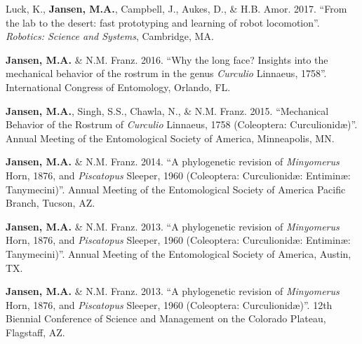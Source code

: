 \documentclass[12pt,a4paper]{article}
\begin{document}
\begin{description}
		\item Luck, K., \textbf{Jansen, M.A.}, Campbell, J., Aukes, D., \& H.B. Amor. 2017. ``From the lab to the desert: fast prototyping and learning of robot locomotion''. \textit{Robotics: Science and Systems}, Cambridge, MA.
		\item \textbf{Jansen, M.A.} \& N.M. Franz. 2016. ``Why the long face? Insights into the mechanical behavior of the rostrum in the genus \textit{Curculio} Linnaeus, 1758''. International Congress of Entomology, Orlando, FL.
		\item \textbf{Jansen, M.A.}, Singh, S.S., Chawla, N., \& N.M. Franz. 2015. ``Mechanical Behavior of the Rostrum of \textit{Curculio} Linnaeus, 1758 (Coleoptera: Curculionid\ae)''. Annual Meeting of the Entomological Society of America, Minneapolis, MN.
		\item \textbf{Jansen, M.A.} \& N.M. Franz. 2014. ``A phylogenetic revision of \textit{Minyomerus} Horn, 1876, and \textit{Piscatopus} Sleeper, 1960 (Coleoptera: Curculionid\ae: Entimin\ae: Tanymecini)''. Annual Meeting of the Entomological Society of America Pacific Branch, Tucson, AZ.
		\item \textbf{Jansen, M.A.} \& N.M. Franz. 2013. ``A phylogenetic revision of \textit{Minyomerus} Horn, 1876, and \textit{Piscatopus} Sleeper, 1960 (Coleoptera: Curculionid\ae: Entimin\ae: Tanymecini)''. Annual Meeting of the Entomological Society of America, Austin, TX.
		\item \textbf{Jansen, M.A.} \& N.M. Franz. 2013. ``A phylogenetic revision of \textit{Minyomerus} Horn, 1876, and \textit{Piscatopus} Sleeper, 1960 (Coleoptera: Curculionid\ae)''. 12th Biennial Conference of Science and Management on the Colorado Plateau, Flagstaff, AZ.
	\end{description}
\end{document}
